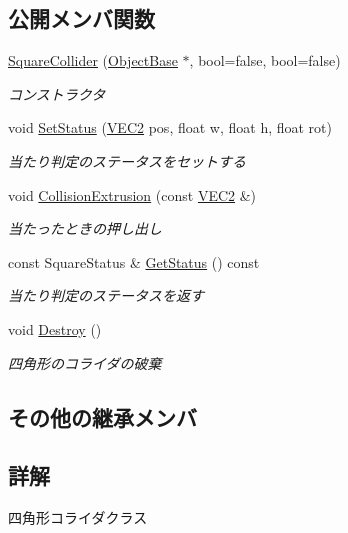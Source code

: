 \subsection*{公開メンバ関数}
\begin{DoxyCompactItemize}
\item 
\mbox{\hyperlink{class_square_collider_a354753b61e7fa39cb5e7aadcddb78910}{Square\+Collider}} (\mbox{\hyperlink{class_object_base}{Object\+Base}} $\ast$, bool=false, bool=false)
\begin{DoxyCompactList}\small\item\em コンストラクタ \end{DoxyCompactList}\item 
void \mbox{\hyperlink{class_square_collider_ab5e57de1f1fddd5a6935e4ed8739b4b2}{Set\+Status}} (\mbox{\hyperlink{transform_8h_afb0c5e21d4133ff4f200992c0b534e1b}{V\+E\+C2}} pos, float w, float h, float rot)
\begin{DoxyCompactList}\small\item\em 当たり判定のステータスをセットする \end{DoxyCompactList}\item 
void \mbox{\hyperlink{class_square_collider_a68cf6f1607d0d460e3a4ba31a49153d8}{Collision\+Extrusion}} (const \mbox{\hyperlink{transform_8h_afb0c5e21d4133ff4f200992c0b534e1b}{V\+E\+C2}} \&)
\begin{DoxyCompactList}\small\item\em 当たったときの押し出し \end{DoxyCompactList}\item 
const Square\+Status \& \mbox{\hyperlink{class_square_collider_ac437bc1bed951c82ca25d2b17a7b2e0f}{Get\+Status}} () const
\begin{DoxyCompactList}\small\item\em 当たり判定のステータスを返す \end{DoxyCompactList}\item 
void \mbox{\hyperlink{class_square_collider_a83273e0e63692aa8020b8deedd456886}{Destroy}} ()
\begin{DoxyCompactList}\small\item\em 四角形のコライダの破棄 \end{DoxyCompactList}\end{DoxyCompactItemize}
\subsection*{その他の継承メンバ}


\subsection{詳解}
四角形コライダクラス 


